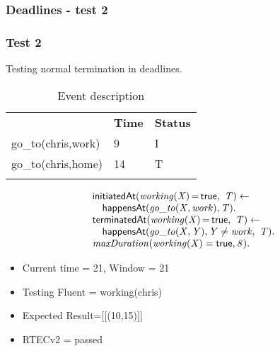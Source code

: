 \documentclass[8pt]{beamer}
\DeclareMathOperator{\val}{=}  %
\def \patsize {}
\def\happensAt{\textsf{\patsize happensAt}}
\def\initiatedAt{\textsf{\patsize initiatedAt}}
\def\terminatedAt{\textsf{\patsize terminatedAt}}
\def\true{\textsf{\patsize true}}
\newenvironment{mysplit}%
  {\arraycolsep 0pt \begin{array}{l}}%
  {\end{array}}
\begin{document}
\begin{frame}
    \frametitle{Deadlines - test 2}
    \subsubsection{Test 2}
    \small
    Testing normal termination in deadlines.\linebreak
    \begin{minipage}{0.48\linewidth}
        \begin{table}[t!]
            \caption{Event description}
            \begin{center}

                \begin{tabular}{lll}
                    \hline\noalign{\smallskip}
                    \multicolumn{1}{l}{\textbf{Event}} & \multicolumn{1}{c}{\textbf{Time}} & \multicolumn{1}{c}{\textbf{Status}} \\
                    go\_to(chris,work)& 9 & I\\
                    go\_to(chris,home)& 14 & T\\
                    \noalign{\smallskip}
                    \hline
                \end{tabular}
            \end{center}
        \end{table}
    \end{minipage}
    \begin{minipage}{0.48\linewidth}
        \begin{align*}
            \begin{mysplit}
                \initiatedAt\mathit{(working(X)\val\true,\ T)\leftarrow}\\
                \quad    \happensAt\mathit{(go\_to(X,work),T)}.\\
                \terminatedAt\mathit{(working(X)\val\true,\ T) \leftarrow}\\
                \quad    \happensAt\mathit{(go\_to(X,Y),Y\neq work,\ T)}.\\
                \mathit{maxDuration(working(X)=\true,8)}.\\
            \end{mysplit}
        \end{align*}
    \end{minipage}
    \begin{itemize}
        \item Current time = 21, Window = 21
        \item Testing Fluent = working(chris)
        \item Expected Result=[[(10,15)]]
        \item RTECv2 = passed
    \end{itemize}
\end{frame}
\end{document}
